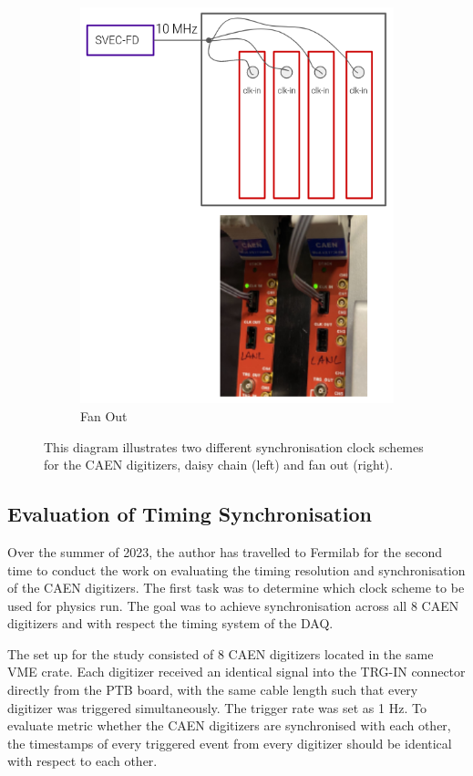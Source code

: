 \begin{figure}[htbp!]
\begin{subfigure}[h]{0.49\linewidth}
\includegraphics[width=\linewidth]{fanout}
\caption{Fan Out}
\end{subfigure}%
\caption[clockScheme]{
This diagram illustrates two different synchronisation clock schemes for the CAEN digitizers, daisy chain (left) and fan out (right).
}
\label{fig:clockScheme}
\end{figure}

\subsection{Evaluation of Timing Synchronisation}
\label{section5.4.2}
Over the summer of 2023, the author has travelled to Fermilab for the second time to conduct the work on evaluating the timing resolution and synchronisation of the CAEN digitizers.
The first task was to determine which clock scheme to be used for physics run. 
The goal was to achieve synchronisation across all 8 CAEN digitizers and with respect the timing system of the DAQ.

The set up for the study consisted of 8 CAEN digitizers located in the same VME crate. 
Each digitizer received an identical signal into the TRG-IN connector directly from the PTB board, with the same cable length such that every digitizer was triggered simultaneously.
The trigger rate was set as 1 Hz.
To evaluate metric whether the CAEN digitizers are synchronised with each other, the timestamps of every triggered event from every digitizer should be identical with respect to each other. 

